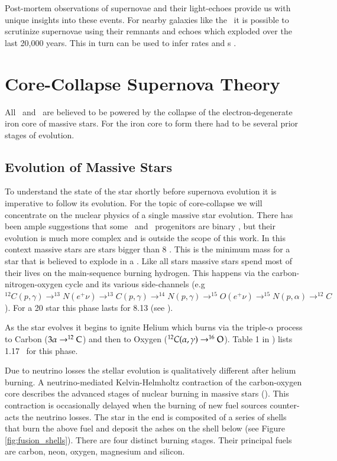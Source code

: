 Post-mortem observations of supernovae and their light-echoes provide us with unique insights into these events. For nearby galaxies like the \lmc\ it is possible to scrutinize supernovae using their remnants and echoes which exploded over the last 20,000 years. This in turn can be used to infer rates and \dtd s \citep{2010MNRAS.407.1314M}.
\newpage
\section{Core-Collapse Supernova Theory}

All \snii\ and \snibc\ are believed to be powered by the collapse of the electron-degenerate iron core of massive stars. For the iron core to form there had to be several prior stages of evolution.

\subsection{Evolution of Massive Stars}  To understand the state of the star shortly before supernova evolution it is imperative to follow its evolution. For the topic of core-collapse we will concentrate on the nuclear physics of a single massive star evolution. There has been ample suggestions that some \snii\ and \snibc\ progenitors are binary \citep{1992ApJ...391..246P}, but their evolution is much more complex and is outside the scope of this work.  In this context massive stars are stars bigger than 8 \msun. This is the minimum mass for a star that is believed to explode in a \snii. Like all stars massive stars spend most of their lives on the main-sequence burning hydrogen. This happens via the carbon-nitrogen-oxygen cycle and its various side-channels (e.g $^{12}C(p,\gamma)\rightarrow^{13}N(e^+\nu)\rightarrow^{13}C(p,\gamma)\rightarrow^{14}N(p,\gamma)\rightarrow^{15}O(e^+\nu)\rightarrow^{15}N(p,\alpha)\rightarrow^{12}C$). For a 20 \msun star this phase lasts for 8.13 \myr (see \citet{2002RvMP...74.1015W}).

As the star evolves it begins to ignite Helium which burns via the triple-$\alpha$ process to Carbon ($3\alpha\rightarrow^{12}\textrm{C}$) and then to Oxygen ($^{12}C(\alpha,\gamma)\rightarrow^{16}\textrm{O}$). Table 1 in \citet{2002RvMP...74.1015W}) lists 1.17 \myr\ for this phase. 

Due to neutrino losses the stellar evolution is qualitatively different after helium burning. A neutrino-mediated Kelvin-Helmholtz contraction of the carbon-oxygen core describes the advanced stages of nuclear burning in massive stars (\citet{2002RvMP...74.1015W}). This contraction is occasionally delayed when the burning of new fuel sources counter-acts the neutrino losses. The star in the end is composited of a series of shells that burn the above fuel and deposit the ashes on the shell below (see Figure \ref{fig:fusion_shells}). There are four distinct burning stages. Their principal fuels are carbon, neon, oxygen, magnesium and silicon.

